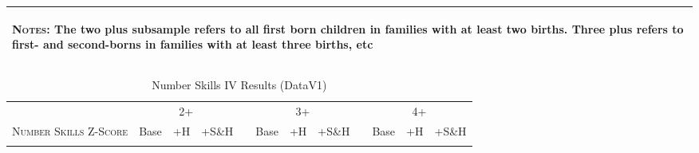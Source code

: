 \begin{landscape}
\begin{table}[htpb!]
\begin{center}
\begin{tabular}{lcccp{2mm}cccp{2mm}ccc}
\midrule\multicolumn{12}{p{19.2cm}}{\begin{footnotesize}\textsc{Notes:} The two plus subsample refers to all first born children in families with at least two births.  Three plus refers to first- and second-borns in families with at least three births, etc\end{footnotesize}} \\ \bottomrule 
\end{tabular}\end{center}\end{table}\end{landscape}\begin{landscape}\begin{table}[htpb!]\caption{Number Skills IV Results (DataV1)}
\label{TWINtab:IVAll}
\begin{center}\begin{tabular}{lcccp{2mm}cccp{2mm}ccc}
\toprule \toprule 
&\multicolumn{3}{c}{2+}&&\multicolumn{3}{c}{3+}&&\multicolumn{3}{c}{4+}\\ \cmidrule(r){2-4} \cmidrule(r){6-8} \cmidrule(r){10-12} 
\textsc{Number Skills Z-Score}&Base&+H&+S\&H&&Base&+H&+S\&H&&Base&+H&+S\&H\\ \midrule 
\begin{footnotesize}\end{footnotesize}& 
\begin{footnotesize}\end{footnotesize}& 
\begin{footnotesize}\end{footnotesize}& 
\begin{footnotesize}\end{footnotesize}& 
\begin{footnotesize}\end{footnotesize}& 
\begin{footnotesize}\end{footnotesize}& 
\begin{footnotesize}\end{footnotesize}& 
\begin{footnotesize}\end{footnotesize}& 
\begin{footnotesize}\end{footnotesize}& 
\begin{footnotesize}\end{footnotesize}& 
\begin{footnotesize}\end{footnotesize}& 
\begin{footnotesize}\end{footnotesize}\\ 

\end{tabular}
\end{center}
\end{table}
\end{landscape}
